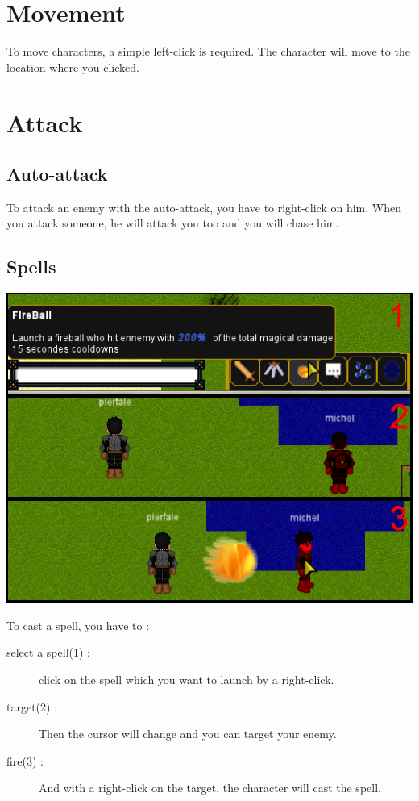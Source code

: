 \documentclass{scrreprt}
\begin{document}
			  \section{Movement}
			  To move characters, a simple left-click is required. The character will move to the location where you clicked.
			  \section{Attack}
			  \subsection{Auto-attack}
			  To attack an enemy with the auto-attack, you have to right-click on him. When you attack someone, he will attack you too and you will chase him.
			  \subsection{Spells}
			  \begin{center}
			  \includegraphics[scale=0.4]{cast_spell.png}
			  \end{center}
			  To cast a spell, you have to :
			  \begin{description}
			  \item[select a spell(1) :]{click on the spell which you want to launch by a right-click.} 
			  \item[target(2) :]{Then the cursor will change and you can target your enemy.}
			  \item[fire(3) :]{And with a right-click on the target, the character will cast the spell.}
			  \end{description}
\end{document}
